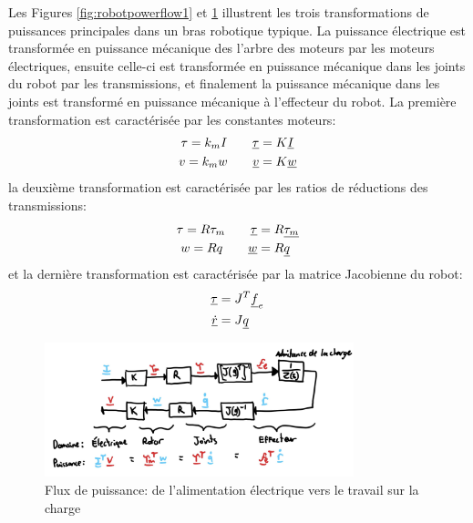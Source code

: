 Les Figures \ref{fig:robotpowerflow1} et \ref{fig:robotpowerflow2} illustrent les trois transformations de puissances principales dans un bras robotique typique. La puissance électrique est transformée en puissance mécanique des l'arbre des moteurs par les moteurs électriques, ensuite celle-ci est transformée en puissance mécanique dans les joints du robot par les transmissions, et finalement la puissance mécanique dans les joints est transformé en puissance mécanique à l'effecteur du robot. La première transformation est caractérisée par les constantes moteurs:
\begin{align}
\tau = k_m I \quad \quad  \underline{\tau} &= K \underline{I} \\
v = k_m w \quad \quad  \underline{v} &= K \underline{w}
\end{align}
la deuxième transformation est caractérisée par les ratios de réductions des transmissions:
\begin{align}
\tau = R \tau_m \quad \quad  \underline{\tau} &= R \underline{\tau_m } \\
w = R q \quad \quad  \underline{w} &= R \underline{q}
\end{align}
et la dernière transformation est caractérisée par la matrice Jacobienne du robot:
\begin{align}
\underline{\tau} &= J^T \underline{f}_e \\
\underline{\dot{r}} &= J \underline{q}
\end{align}

\begin{figure}[htpb]
	\centering
		\includegraphics[width=0.80\textwidth]{fig/robotpowerflow2.jpg}
	\caption{Flux de puissance: de l'alimentation électrique vers le travail sur la charge}
	\label{fig:robotpowerflow2}
\end{figure}





